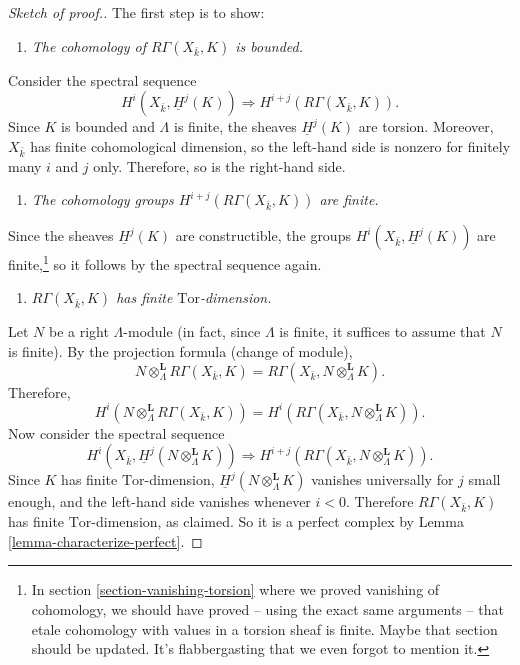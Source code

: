 \begin{proof}[Sketch of proof.]
The first step is to show:
\begin{enumerate}
\item[(1)]
{\it The cohomology of $R\Gamma(X_{\bar k}, K)$ is bounded.}
\end{enumerate}
Consider the spectral sequence
$$
H^i(X_{\bar k}, \underline H^j(K))
\Rightarrow
H^{i+j} (R\Gamma(X_{\bar k}, K)).
$$
Since $K$ is bounded and $\Lambda$ is finite, the sheaves $\underline H^j(K)$
are torsion. Moreover, $X_{\bar k}$ has finite cohomological dimension, so the
left-hand side is nonzero for finitely many $i$ and $j$ only. Therefore, so is
the right-hand side.
\begin{enumerate}
\item[(2)]
{\it The cohomology groups $H^{i+j} (R\Gamma(X_{\bar k}, K))$ are finite.}
\end{enumerate}
Since the sheaves $\underline H^j(K)$ are constructible, the groups
$H^i(X_{\bar k}, \underline H^j(K))$ are finite,\footnote{In section
\ref{section-vanishing-torsion} where we proved vanishing of
cohomology, we should have proved -- using the exact same arguments -- that
etale cohomology with values in a torsion sheaf is finite. Maybe that section
should be updated. It's flabbergasting that we even forgot to mention it.} so
it follows by the spectral sequence again.
\begin{enumerate}
\item[(3)]
{\it $R\Gamma(X_{\bar k}, K)$ has finite $\text{Tor}$-dimension.}
\end{enumerate}
Let $N$ be a right $\Lambda$-module (in fact, since $\Lambda$ is finite, it
suffices to assume that $N$ is finite). By the projection formula (change of
module),
$$
N\otimes^\mathbf{L}_\Lambda R \Gamma(X_{\bar k}, K) = R\Gamma(X_{\bar k},
N\otimes^\mathbf{L}_\Lambda K).
$$
Therefore,
$$
H^i (N\otimes^\mathbf{L}_\Lambda R\Gamma(X_{\bar k}, K)) = H^i(R\Gamma(X_{\bar
k}, N \otimes_{\Lambda}^\mathbf{L} K)).
$$
Now consider the spectral sequence
$$
H^i (X_{\bar k}, \underline H^j (N\otimes_{\Lambda}^\mathbf{L} K))
\Rightarrow
H^{i+j}(R\Gamma(X_{\bar k}, N \otimes_{\Lambda}^\mathbf{L} K)).
$$
Since $K$ has finite $\text{Tor}$-dimension, $\underline H^j
(N\otimes_{\Lambda}^\mathbf{L} K)$ vanishes universally for $j$ small enough,
and the left-hand side vanishes whenever $i < 0$. Therefore $R\Gamma(X_{\bar
k}, K)$ has finite $\text{Tor}$-dimension, as claimed. So it is a perfect
complex by Lemma \ref{lemma-characterize-perfect}.
\end{proof}





